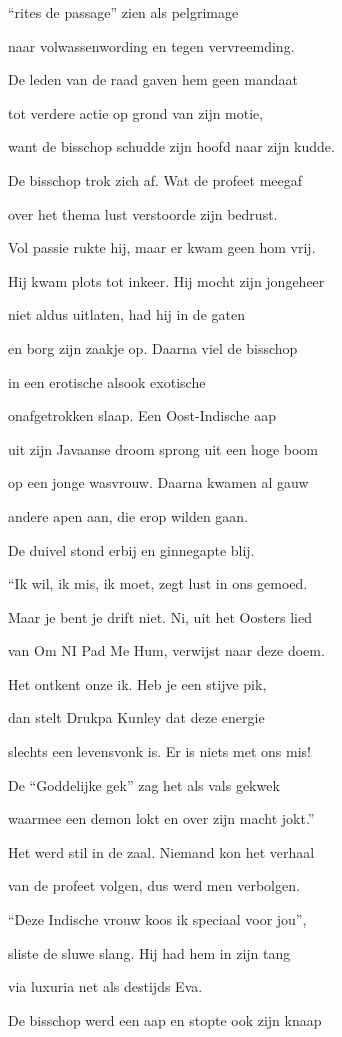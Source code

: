 “rites de passage”
zien als pelgrimage

naar volwassenwording
en tegen vervreemding.

De leden van de raad
gaven hem geen mandaat

tot verdere actie
op grond van zijn motie,

want de bisschop schudde
zijn hoofd naar zijn kudde.

De bisschop trok zich af.
Wat de profeet meegaf

over het thema lust
verstoorde zijn bedrust.

Vol passie rukte hij,
maar er kwam geen hom vrij.

Hij kwam plots tot inkeer.
Hij mocht zijn jongeheer

niet aldus uitlaten,
had hij in de gaten

en borg zijn zaakje op.
Daarna viel de bisschop

in een erotische
alsook exotische

onafgetrokken slaap.
Een Oost-Indische aap

uit zijn Javaanse droom
sprong uit een hoge boom

op een jonge wasvrouw.
Daarna kwamen al gauw

andere apen aan,
die erop wilden gaan.

De duivel stond erbij
en ginnegapte blij.

“Ik wil, ik mis, ik moet,
zegt lust in ons gemoed.

Maar je bent je drift niet.
Ni, uit het Oosters lied

van Om NI Pad Me Hum,
verwijst naar deze doem.

Het ontkent onze ik.
Heb je een stijve pik,

dan stelt Drukpa Kunley
dat deze energie

slechts een levensvonk is.
Er is niets met ons mis!

De “Goddelijke gek”
zag het als vals gekwek

waarmee een demon lokt
en over zijn macht jokt.”

Het werd stil in de zaal.
Niemand kon het verhaal

van de profeet volgen,
dus werd men verbolgen.

“Deze Indische vrouw
koos ik speciaal voor jou”,

sliste de sluwe slang.
Hij had hem in zijn tang

via luxuria
net als destijds Eva.

De bisschop werd een aap
en stopte ook zijn knaap

